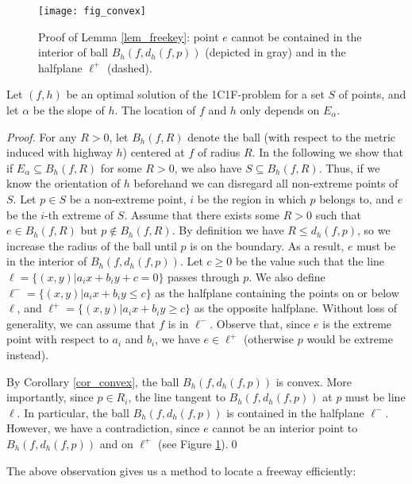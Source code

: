 \documentclass{llncs}
\begin{document}
\begin{figure}[h]
    \centering
    \texttt{[image: fig\_convex]}
    \caption{Proof of Lemma \ref{lem_freekey}: point $e$ cannot be contained in the interior of ball $B_h(f,d_h(f,p))$ (depicted in gray) and in the halfplane $\ell^+$ (dashed).}
    \label{fig_convex}
\end{figure}
\begin{lemma}\label{lem_freekey}
Let $(f,h)$ be an optimal solution of the 1C1F-problem for a set $S$ of points, and let ${\alpha}$ be the slope of $h$. The location of $f$ and $h$ only depends on $E_{\alpha}$.
\end{lemma}
\begin{proof}
For any $R>0$, let $B_h(f,R)$ denote the ball (with respect to the metric induced with highway $h$) centered at $f$ of radius $R$. In the following we show that if $E_{\alpha} \subseteq B_h(f,R)$ for some $R>0$, we also have $S\subseteq B_h(f,R)$. Thus, if we know the orientation of $h$ beforehand we can disregard all non-extreme points of $S$.
Let $p\in S$ be a non-extreme point, $i$ be the region in which $p$ belongs to, and $e$ be the $i$-th extreme of $S$. Assume that there exists some $R>0$ such that $e\in B_h(f,R)$ but $p\not\in B_h(f,R)$. By definition we have $R\leq d_h(f,p)$, so we increase the radius of the ball until $p$ is on the boundary. As a result, $e$ must be in the interior of $B_h(f,d_h(f,p))$. Let $c\geq 0$ be the value such that the line $\ell=\{(x,y)| a_ix+b_iy+c=0\}$ passes through $p$. We also define $\ell^{-}=\{(x,y)| a_ix+b_iy \leq c\}$ as the halfplane containing the points on or below $\ell$, and $\ell^{+}=\{(x,y)| a_ix+b_iy \geq c\}$ as the opposite halfplane. Without loss of generality, we can assume that $f$ is in $\ell^-$. Observe that, since $e$ is the extreme point with respect to $a_i$ and $b_i$, we have $e\in\ell^+$ (otherwise $p$ would be extreme instead).

By Corollary \ref{cor_convex}, the ball $B_h(f,d_h(f,p))$ is convex. More importantly, since $p\in R_i$, the line tangent to $B_h(f,d_h(f,p))$ at $p$ must be  line $\ell$. In particular, the ball $B_h(f,d_h(f,p))$ is contained in the halfplane $\ell^-$. However, we have a contradiction, since $e$ cannot be an interior point to $B_h(f,d_h(f,p))$ and on $\ell^+$ (see Figure \ref{fig_convex}).\qed
\end{proof}

The above observation gives us a method to locate a freeway efficiently:
\end{document}
